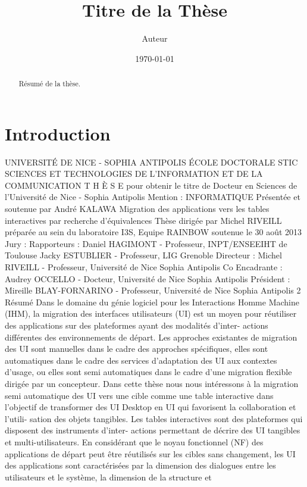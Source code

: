 \documentclass{article}
\title{Titre de la Thèse}
\author{Auteur}
\date{\today}
\begin{document}
\maketitle

\begin{abstract}
Résumé de la thèse.
\end{abstract}

\tableofcontents

\section{Introduction}
UNIVERSITÉ DE NICE - SOPHIA ANTIPOLIS
ÉCOLE DOCTORALE STIC
SCIENCES ET TECHNOLOGIES DE L’INFORMATION
ET DE LA COMMUNICATION
T H È S E
pour obtenir le titre de
Docteur en Sciences
de l’Université de Nice - Sophia Antipolis
Mention : INFORMATIQUE
Présentée et soutenue par
André KALAWA
Migration des applications vers les tables
interactives par recherche d’équivalences
Thèse dirigée par Michel RIVEILL
préparée au sein du laboratoire I3S, Equipe RAINBOW
soutenue le 30 août 2013
Jury :
Rapporteurs :
Daniel HAGIMONT
-
Professeur, INPT/ENSEEIHT de Toulouse
Jacky ESTUBLIER
-
Professeur, LIG Grenoble
Directeur :
Michel RIVEILL
-
Professeur, Université de Nice Sophia Antipolis
Co Encadrante :
Audrey OCCELLO
-
Docteur, Université de Nice Sophia Antipolis
Président :
Mireille BLAY-FORNARINO
-
Professeur, Université de Nice Sophia Antipolis
2
Résumé
Dans le domaine du génie logiciel pour les Interactions Homme Machine (IHM), la migration des interfaces
utilisateurs (UI) est un moyen pour réutiliser des applications sur des plateformes ayant des modalités d’inter-
actions différentes des environnements de départ. Les approches existantes de migration des UI sont manuelles
dans le cadre des approches spéciﬁques, elles sont automatiques dans le cadre des services d’adaptation des UI
aux contextes d’usage, ou elles sont semi automatiques dans le cadre d’une migration ﬂexible dirigée par un
concepteur.
Dans cette thèse nous nous intéressons à la migration semi automatique des UI vers une cible comme une
table interactive dans l’objectif de transformer des UI Desktop en UI qui favorisent la collaboration et l’utili-
sation des objets tangibles. Les tables interactives sont des plateformes qui disposent des instruments d’inter-
actions permettant de décrire des UI tangibles et multi-utilisateurs. En considérant que le noyau fonctionnel
(NF) des applications de départ peut être réutilisés sur les cibles sans changement, les UI des applications sont
caractérisées par la dimension des dialogues entre les utilisateurs et le système, la dimension de la structure et
\end{document}
